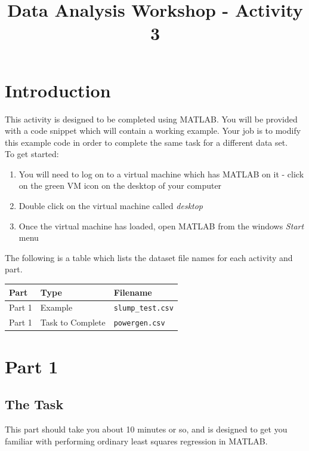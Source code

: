 \documentclass[12pt]{article}
\begin{document}
 
\title{Data Analysis Workshop - Activity 3}
\author{}
\date{}
\maketitle

\section*{Introduction}
This activity is designed to be completed using MATLAB. You will be provided with a code snippet which will contain a working example. Your job is to modify this example code in order to complete the same task for a different data set.\\

To get started:
\begin{enumerate}
\item You will need to log on to a virtual machine which has MATLAB on it - click on the green VM icon on the desktop of your computer
\item Double click on the virtual machine called \textit{desktop}
\item Once the virtual machine has loaded, open MATLAB from the windows \textit{Start} menu
\end{enumerate}
\vspace{0.5cm}
The following is a table which lists the dataset file names for each activity and part.
\begin{table}[h]
\centering
\begin{tabular}{l l l}
\toprule
\textbf{Part} & \textbf{Type} & \textbf{Filename}\\
\midrule
Part 1 & Example & \verb|slump_test.csv|\\
Part 1 & Task to Complete & \verb|powergen.csv|\\
\bottomrule
\end{tabular}
\end{table}

\section*{Part 1}
\subsection*{The Task}
This part should take you about 10 minutes or so, and is designed to get you familiar with performing ordinary least squares regression in MATLAB.\\
\end{document}
